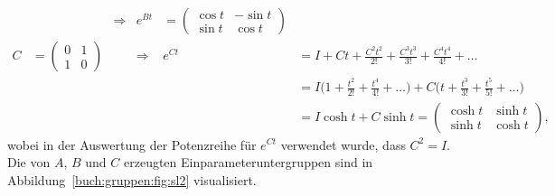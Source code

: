 \begin{beispiel}
\begin{align*}
&&\Rightarrow&
e^{Bt}
&=
\begin{pmatrix}
\cos t & -\sin t\\
\sin t &  \cos t
\end{pmatrix}
\\
C
&=
\begin{pmatrix}0&1\\1&0\end{pmatrix}
&&\Rightarrow&
e^{Ct}
&=
I + Ct + \frac{C^2t^2}{2!} + \frac{C^3t^3}{3!} + \frac{C^4t^4}{4!}+\dots
\\
&&&&
&=
I\biggl(1 + \frac{t^2}{2!} + \frac{t^4}{4!}+\dots \biggr)
+
C\biggl(t + \frac{t^3}{3!} + \frac{t^5}{5!}+\dots \biggr)
\\
&&&&
&=
I\cosh t + C \sinh t
=
\begin{pmatrix}
\cosh t & \sinh t\\
\sinh t & \cosh t
\end{pmatrix},
\end{align*}
wobei in der Auswertung der Potenzreihe für $e^{Ct}$ verwendet wurde,
dass $C^2=I$.
Die von $A$, $B$ und $C$ erzeugten Einparameteruntergruppen sind in
Abbildung~\ref{buch:gruppen:fig:sl2} visualisiert.


\end{beispiel}
